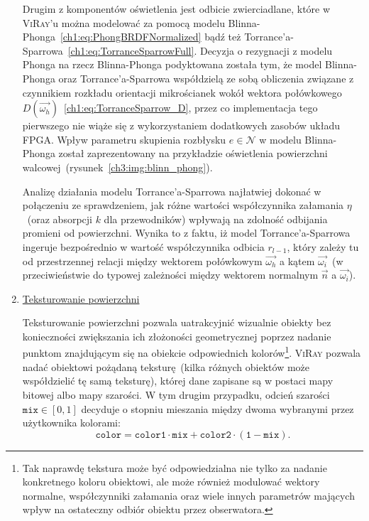 \begin{enumerate}


Drugim z komponentów oświetlenia jest odbicie zwierciadlane, które w \textsc{ViRay}'u można modelować za pomocą modelu Blinna-Phonga~\eqref{ch1:eq:PhongBRDFNormalized} bądź też Torrance'a-Sparrowa~\eqref{ch1:eq:TorranceSparrowFull}. Decyzja o rezygnacji z modelu Phonga na rzecz Blinna-Phonga podyktowana została tym, że model Blinna-Phonga oraz Torrance'a-Sparrowa współdzielą ze sobą obliczenia związane z czynnikiem rozkładu orientacji mikrościanek wokół wektora połówkowego $D(\vec{\omega_h})$~\eqref{ch1:eq:TorranceSparrow_D}, przez co implementacja tego pierwszego nie wiąże się z wykorzystaniem dodatkowych zasobów układu FPGA. Wpływ parametru skupienia rozbłysku $e \in \mathcal{N}$ w modelu Blinna-Phonga został zaprezentowany na przykładzie oświetlenia powierzchni walcowej~(rysunek~\ref{ch3:img:blinn_phong}).


Analizę działania modelu Torrance'a-Sparrowa najłatwiej dokonać w połączeniu ze sprawdzeniem, jak różne wartości współczynnika załamania $\eta$~(oraz absorpcji $k$ dla przewodników) wpływają na zdolność odbijania promieni od powierzchni. Wynika to z faktu, iż model Torrance'a-Sparrowa ingeruje bezpośrednio w wartość współczynnika odbicia $r_{l-1}$, który zależy tu od przestrzennej relacji między wektorem połówkowym $\vec{\omega_h}$ a kątem $\vec{\omega_i}$~(w przeciwieństwie do typowej zależności między wektorem normalnym $\vec{n}$ a $\vec{\omega_i}$).



\item \underline{Teksturowanie powierzchni}

Teksturowanie powierzchni pozwala uatrakcyjnić wizualnie obiekty bez konieczności zwiększania ich złożoności geometrycznej poprzez nadanie punktom znajdującym się na obiekcie odpowiednich kolorów\footnote{Tak naprawdę tekstura może być odpowiedzialna nie tylko za nadanie konkretnego koloru obiektowi, ale może również modulować wektory normalne, współczynniki załamania oraz wiele innych parametrów mających wpływ na ostateczny odbiór obiektu przez obserwatora.}. \textsc{ViRay} pozwala nadać obiektowi pożądaną teksturę~(kilka różnych obiektów może współdzielić tę samą teksturę), której dane zapisane są w postaci mapy bitowej albo mapy szarości. W tym drugim przypadku, odcień szarości $\mathtt{mix}\in[0, 1]$ decyduje o stopniu mieszania między dwoma wybranymi przez użytkownika kolorami:
\begin{equation*}
\mathtt{color = color1\cdot mix + color2\cdot\left(1 - mix \right)}.
\end{equation*}


\end{enumerate}
